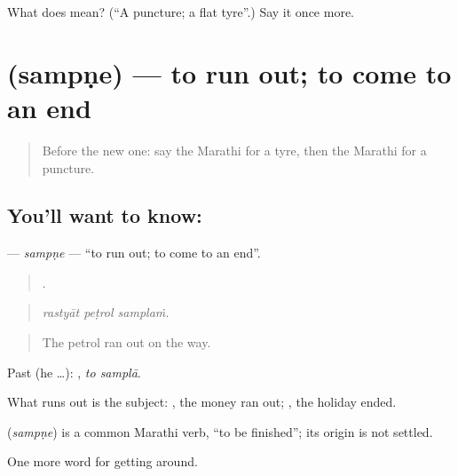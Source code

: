 \begin{tcolorbox}[breakable,colback=teal!4,colframe=teal!35!black,title={Before you move on}]
What does  mean? (\textquotedblleft{}A puncture; a flat tyre\textquotedblright{}.) Say it once more.
\end{tcolorbox}
\section[\texorpdfstring{\mr{संपणे} (sampṇe)}{संपणे (sampṇe)}]{ (sampṇe) — to run out; to come to an end}

\label{lesson:MR-C401-sampne}



\begin{quote}
Before the new one: say the Marathi for a tyre, then the Marathi for a puncture.
\end{quote}

\subsection*{You'll want to know: }
\textbf{} — \emph{sampṇe} — \textquotedblleft{}to run out; to come to an end\textquotedblright{}.

\begin{quote}
  .
\end{quote}

\begin{quote}
\emph{rastyāt peṭrol samplaṁ.}
\end{quote}

\begin{quote}
The petrol ran out on the way.
\end{quote}

Past (he …):  , \emph{to samplā}.

What runs out is the subject:  , the money ran out;  , the holiday ended.

\begin{cousinweb}
\textbf{} (\emph{sampṇe}) is a common Marathi verb, \textquotedblleft{}to be finished\textquotedblright{}; its origin is not settled.
\end{cousinweb}

\begin{grammarlens}[title={What you've built}]
One more word for getting around.
\end{grammarlens}

